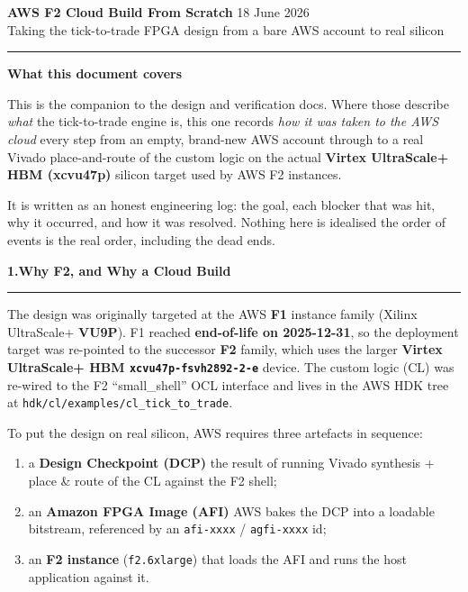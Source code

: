 \documentclass[10pt,a4paper]{article}
\newcommand{\sectionrule}{\par\nobreak\vspace{1pt}\textcolor{rulegray}{\rule{\linewidth}{0.8pt}}\par\vspace{1pt}}
\newcommand{\fpath}[1]{\texttt{\textcolor{hdrblue}{#1}}}
\newcommand{\sechead}[2]{{\large\bfseries\color{hdrblue} #1\quad #2}\sectionrule}
\begin{document}
{\LARGE\bfseries\color{hdrblue} AWS F2 Cloud Build \textendash{} From Scratch}%
\hfill{\small\color{rulegray} 18 June 2026}\\[-2pt]
{\large\color{accentteal} Taking the tick-to-trade FPGA design from a bare AWS account to real silicon}

\textcolor{hdrblue}{\rule{\linewidth}{2pt}}

\begin{keybox}
{\large\bfseries\color{newtext} What this document covers}

\smallskip
This is the companion to the design and verification docs. Where those describe
\emph{what} the tick-to-trade engine is, this one records \emph{how it was taken
to the AWS cloud} \textendash{} every step from an empty, brand-new AWS account
through to a real Vivado place-and-route of the custom logic on the actual
\textbf{Virtex UltraScale+ HBM (xcvu47p)} silicon target used by AWS F2 instances.

\smallskip
It is written as an honest engineering log: the goal, each blocker that was hit,
why it occurred, and how it was resolved. Nothing here is idealised \textendash{}
the order of events is the real order, including the dead ends.
\end{keybox}

\sechead{1.}{Why F2, and Why a Cloud Build}

The design was originally targeted at the AWS \textbf{F1} instance family
(Xilinx UltraScale+ \textbf{VU9P}). F1 reached \textbf{end-of-life on
2025-12-31}, so the deployment target was re-pointed to the successor
\textbf{F2} family, which uses the larger \textbf{Virtex UltraScale+ HBM
\fpath{xcvu47p-fsvh2892-2-e}} device. The custom logic (CL) was re-wired to the
F2 ``small\_shell'' OCL interface and lives in the AWS HDK tree at
\fpath{hdk/cl/examples/cl\_tick\_to\_trade}.

To put the design on real silicon, AWS requires three artefacts in sequence:

\begin{enumerate}[leftmargin=2em,itemsep=1pt]
  \item a \textbf{Design Checkpoint (DCP)} \textendash{} the result of running
        Vivado synthesis + place \& route of the CL against the F2 shell;
  \item an \textbf{Amazon FPGA Image (AFI)} \textendash{} AWS bakes the DCP into
        a loadable bitstream, referenced by an \fpath{afi-xxxx} / \fpath{agfi-xxxx} id;
  \item an \textbf{F2 instance} (\fpath{f2.6xlarge}) that loads the AFI and runs
        the host application against it.
\end{enumerate}
\end{document}
